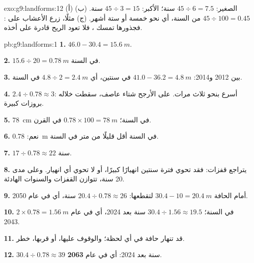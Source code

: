\begin{solution}{exo:g9:landforms:12}
(أ)  الصغير: $45 \div 6 = 7.5$ سنة؛  الأكبر: $45 \div 3 =
15$ سنة. (ب) $45 \div 100 = 0.45$ من السنة، أي نحو خمسة أو ستة أشهر.
(ج) مثلًا، زرع الأعشاب على : فجذورها تمسك ، فلا تعود الريح
قادرة على أخذه.
\end{solution}

\begin{solution}{pb:g9:landforms:1}
\textbf{1.} $46.0 - 30.4 = \qty{15.6}{m}$.

\textbf{2.} $15.6 \div 20 = \qty{0.78}{m}$ في السنة.

\textbf{3.} بين 2012 و2014: $41.0 - 36.2 = \qty{4.8}{m}$ في
سنتين، أي $4.8 \div 2 = \qty{2.4}{m}$ في السنة.

\textbf{4.} $2.4 \div 0.78 \approx 3$: أسرع بنحو ثلاث مرات. على الأرجح
شتاء عاصف، سقطت خلاله بروزات كبيرة.

\textbf{5.} \qty{78}{cm} في السنة؛ $0.78 \times 100 = \qty{78}{m}$ في
القرن.

\textbf{6.} نعم: \qty{0.78}{m} في السنة أقل قليلًا من متر في السنة.

\textbf{7.} $17 \div 0.78 \approx 22$ سنة.

\textbf{8.} يتراجع  قفزات: فقد تحوي فترة سنتين انهيارًا كبيرًا، أو
لا تحوي أي انهيار. وعلى مدى 20 سنة، تتوازن القفزات والسنوات
الهادئة.

\textbf{9.} أمام الحافة $30.4 - 10 = \qty{20.4}{m}$ لتقطعها: $20.4 \div 0.78
\approx 26$ سنة، أي في عام 2050.

\textbf{10.} $2 \times 0.78 = \qty{1.56}{m}$ في السنة؛ $30.4 \div 1.56
\approx 19.5$ سنة بعد 2024، أي في عام 2043.

\textbf{11.} قد تنهار حافة  في أي لحظة؛ والوقوف عليها، أو قربها،
خطر.

\textbf{12.} $30.4 \div 0.78 \approx 39$ سنة بعد 2024: أي في عام
\textbf{2063}.
\end{solution}

